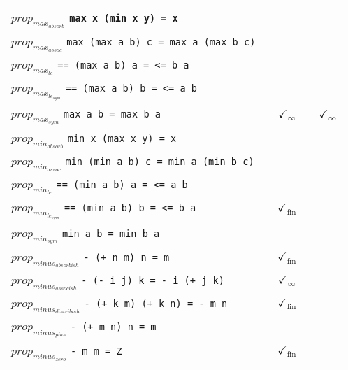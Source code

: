 \documentclass{article}
\begin{document}
\begin{longtable}{p{10cm} || c | c | c | c | }
\hline
$prop_{max_{absorb}}$ \newline \verb`max x (min x y) = x` &  &  &  &  \\
\hline
$prop_{max_{assoc}}$ \newline \verb`max (max a b) c = max a (max b c)` &  &  &  &  \\
\hline
$prop_{max_{le}}$ \newline \verb`== (max a b) a = <= b a` &  &  &  &  \\
\hline
$prop_{max_{le_{sym}}}$ \newline \verb`== (max a b) b = <= a b` &  &  &  &  \\
\hline
$prop_{max_{sym}}$ \newline \verb`max a b = max b a` &  & $\checkmark_{\infty}$ &  & $\checkmark_{\infty}$ \\
\hline
$prop_{min_{absorb}}$ \newline \verb`min x (max x y) = x` &  &  &  &  \\
\hline
$prop_{min_{assoc}}$ \newline \verb`min (min a b) c = min a (min b c)` &  &  &  &  \\
\hline
$prop_{min_{le}}$ \newline \verb`== (min a b) a = <= a b` &  &  &  &  \\
\hline
$prop_{min_{le_{sym}}}$ \newline \verb`== (min a b) b = <= b a` &  & $\checkmark_{\mathrm{fin}}$ &  &  \\
\hline
$prop_{min_{sym}}$ \newline \verb`min a b = min b a` &  &  &  &  \\
\hline
$prop_{minus_{absorbish}}$ \newline \verb`- (+ n m) n = m` &  & $\checkmark_{\mathrm{fin}}$ &  &  \\
\hline
$prop_{minus_{assocish}}$ \newline \verb`- (- i j) k = - i (+ j k)` &  & $\checkmark_{\infty}$ &  &  \\
\hline
$prop_{minus_{distribish}}$ \newline \verb`- (+ k m) (+ k n) = - m n` &  & $\checkmark_{\mathrm{fin}}$ &  &  \\
\hline
$prop_{minus_{plus}}$ \newline \verb`- (+ m n) n = m` &  &  &  &  \\
\hline
$prop_{minus_{zero}}$ \newline \verb`- m m = Z` &  & $\checkmark_{\mathrm{fin}}$ &  &  \\

\end{longtable}
\end{document}
